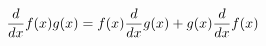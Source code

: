 \documentclass[preview]{standalone}
\begin{document}
\begin{align*}
\special{dvisvgm:raw <g id='unique000'>}\frac{d}{dx}f(x)g(x)=f(x)\frac{d}{dx}g(x)+g(x)\frac{d}{dx}f(x)\special{dvisvgm:raw </g>}
\end{align*}
\end{document}
